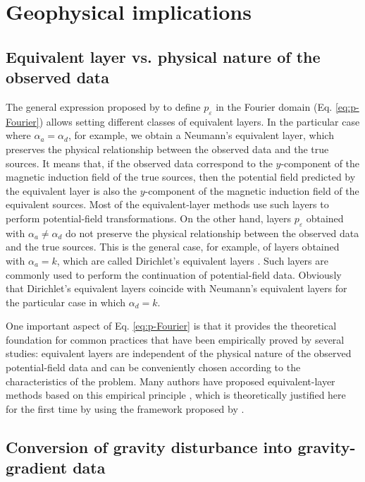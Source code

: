 \section{Geophysical implications}

\subsection{Equivalent layer vs. physical nature of the observed data}

The general expression proposed by \cite{oliveirajr_etal2026_1} to define $p_{\varepsilon}$ in 
the Fourier domain (Eq. \ref{eq:p-Fourier}) allows setting different classes of 
equivalent layers.
In the particular case where $\alpha_{a} = \alpha_{d}$, for example, we obtain a Neumann's 
equivalent layer, which preserves the physical relationship between the observed data and the 
true sources. It means that, if the observed data correspond to the $y$-component of the 
magnetic induction field of the true sources, 
then the potential field predicted by the equivalent layer is also the $y$-component of the 
magnetic induction field of the equivalent sources. Most of the equivalent-layer methods use 
such layers to perform potential-field transformations.
On the other hand, layers $p_{\varepsilon}$ obtained with $\alpha_{a} \ne \alpha_{d}$ do not
preserve the physical relationship between the observed data and the true sources. 
This is the general case, for example, of layers obtained with $\alpha_{a} = k$, which are 
called Dirichlet's equivalent layers \cite{oliveirajr_etal2026_1}. Such layers are commonly used 
to perform the continuation of potential-field data. Obviously that Dirichlet's equivalent 
layers coincide with Neumann's equivalent layers for the particular case in which 
$\alpha_{d} = k$. 

One important aspect of Eq. \ref{eq:p-Fourier} is that it provides the theoretical 
foundation for common practices that have been empirically proved by several studies: 
equivalent layers are independent of the physical nature of the observed potential-field data 
and can be conveniently chosen according to the characteristics of the problem. Many authors 
have proposed equivalent-layer methods based on this empirical principle
\citep[e.g.,][]{cordell1992, guspi_novara2009, li_etal2014, soler_uieda2021}, which is 
theoretically justified here for the first time by using the framework proposed by
\cite{oliveirajr_etal2026_1}.

\subsection{Conversion of gravity disturbance into gravity-gradient data}

